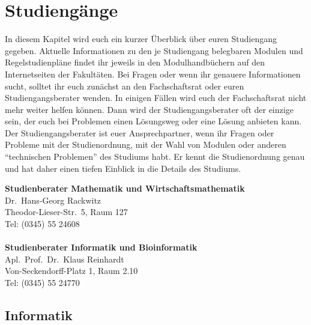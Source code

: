 
\section{Studiengänge}

In diesem Kapitel wird euch ein kurzer Überblick über euren Studiengang gegeben. Aktuelle Informationen zu den je Studiengang belegbaren Modulen und Regelstudienpläne findet ihr jeweils in den Modulhandbüchern auf den Internetseiten der Fakultäten.
Bei Fragen oder wenn ihr genauere Informationen sucht, solltet ihr euch zunächst an den Fachschaftsrat oder euren Studiengangsberater wenden.
In einigen Fällen wird euch der Fachschaftsrat nicht mehr weiter helfen können.
Dann wird der Studiengangsberater oft der einzige sein, der euch bei Problemen einen Lösungsweg oder eine Lösung anbieten kann.
Der Studiengangsberater ist euer Ansprechpartner, wenn ihr Fragen oder Probleme
mit der Studienordnung, mit der Wahl von Modulen oder anderen \enquote{technischen Problemen} des Studiums habt.
Er kennt die Studienordnung genau und hat daher einen tiefen Einblick in die Details des Studiums.

\textbf{Studienberater Mathematik und Wirtschaftsmathematik}\\
Dr.\ Hans-Georg Rackwitz\\
Theodor-Lieser-Str.\ 5, Raum 127\\
Tel: (0345) 55 24608\\
\\

\textbf{Studienberater Informatik und Bioinformatik}\\
Apl.\ Prof.\ Dr.\ Klaus Reinhardt\\
Von-Seckendorff-Platz 1, Raum 2.10\\
Tel: (0345) 55 24770\\



\subsection{Informatik}
\label{studiengang_informatik}

